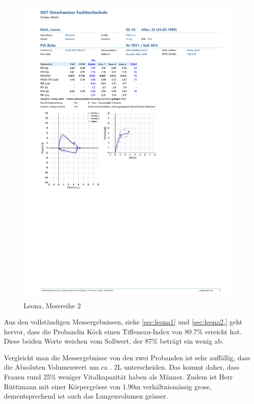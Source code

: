 \documentclass[11pt]{scrartcl}
\begin{document}
        \begin{figure}[H]
        \centering
        \includegraphics[clip, trim=1cm 10cm 0cm 10.6cm, width=15cm]{Dateien/Leona2.pdf}
        \caption{Leona, Messreihe 2}
        \end{figure}


    Aus den vollständigen Messergebnissen, siehe \autoref{sec:leona1} und \autoref{sec:leona2,} geht hervor, dass die
    Probandin Köck einen Tiffeneau-Index von 80.7\% erreicht hat.
    Diese beiden Werte weichen vom Sollwert, der 87\% beträgt ein wenig ab.

    Vergleicht man die Messergebnisse von den zwei Probanden ist sehr auffällig, dass die Absoluten Volumenwert um ca
    . 2L unterscheiden.
    Das kommt daher, dass Frauen rund 25\% weniger Vitalkapazität haben als Männer.
    Zudem ist Herr Rüttimann mit einer Körpergrösse von 1.90m verhältnismässig gross, dementsprechend ist auch das
    Lungenvolumen grösser.
\end{document}
